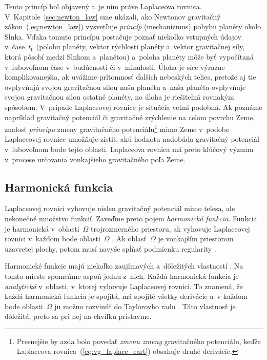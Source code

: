 \documentclass[a4paper,12pt]{book}
\begin{document}
Tento princíp bol objavený a~je ním práve Laplaceova rovnica.  
V~Kapitole~\ref{sec:newton_law} sme ukázali, ako Newtonov gravitačný 
zákon~(\ref{eq:newton_law}) vysvetľuje \emph{princíp} (mechanizmus) pohybu 
planéty okolo Slnka.  Vďaka tomuto princípu postačuje poznať niekoľko vstupných 
údajov v~čase~$t_0$ (polohu planéty, vektor rýchlosti planéty a~vektor 
gravitačnej sily, ktorá pôsobí medzi Slnkom a~planétou) a~poloha planéty môže 
byť vypočítaná v~ľubovoľnom čase v~budúcnosti či v~minulosti.  Úloha je síce 
výrazne komplikovanejšia, ak uvážime prítomnosť ďalších nebeských telies, 
pretože aj tie ovplyvňujú svojou gravitačnou silou našu planétu a~naša planéta 
ovplyvňuje svojou gravitačnou silou ostatné planéty, no úloha je riešiteľná 
rovnakým spôsobom.  V~prípade Laplaceovej rovnice je situácia veľmi podobná.  
Ak poznáme napríklad gravitačný potenciál či gravitačné zrýchlenie na celom 
povrchu Zeme, znalosť \emph{princípu} zmeny gravitačného 
potenciálu\footnote{Presnejšie by azda bolo povedať \textit{zmenu zmeny} 
gravitačného potenciálu, keďže Laplaceova rovnica~(\ref{eq:vg_laplace_cart}) 
obsahuje druhé derivácie.} mimo Zeme v~podobe Laplaceovej rovnice umožňuje 
zistiť, akú hodnotu nadobúda gravitačný potenciál v~ľubovoľnom bode tejto 
oblasti.  Laplaceova rovnica má preto kľúčový význam v~procese určovania 
vonkajšieho gravitačného poľa Zeme.




\subsection{Harmonická funkcia}
\label{sec:harmonic_function}

Laplaceovej rovnici vyhovuje nielen gravitačný potenciál mimo telesa, ale
nekonečné množstvo funkcií.  Zaveďme preto pojem \emph{harmonická funkcia}.
Funkcia je harmonická v~oblasti~$\Omega$ trojrozmerného priestoru, ak vyhovuje 
Laplaceovej rovnici v~každom bode oblasti~$\Omega$ 
\parencite{MoritzPhysicalGeodesy}.  Ak oblasť~$\Omega$ je vonkajším priestorom 
uzavretej plochy, potom musí navyše spĺňať podmienku regularity 
\parencite[pozri vzťah~\ref{eq:regular_function};][]{MoritzPhysicalGeodesy}.

Harmonické funkcie majú niekoľko zaujímavých a~dôležitých vlastností 
\parencite[pozri napríklad][]{Pick1973,Kellogg1967,Janak2006}.  Na tomto mieste 
spomeňme aspoň jednu z~nich.  Každá harmonická funkcia je \emph{analytická} 
v~oblasti, v~ktorej vyhovuje
Laplaceovej rovnici.  To znamená, že každá
harmonická funkcia je spojitá, má spojité všetky derivácie a~v každom bode
oblasti~$\Omega$ ju možno rozvinúť do Taylorovho radu 
\parencite{MoritzPhysicalGeodesy}.  Táto vlastnosť je dôležitá, preto sa pri 
nej na chvíľku
pristavme.
\end{document}
